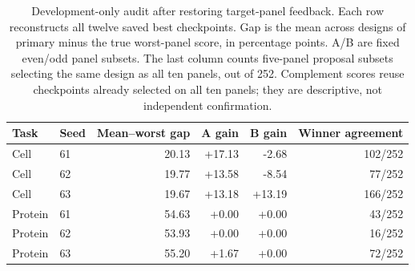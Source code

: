\begin{table}[htbp]
\centering
\small
\caption{Development-only audit after restoring target-panel feedback. Each row reconstructs all twelve saved best checkpoints. Gap is the mean across designs of primary minus the true worst-panel score, in percentage points. A/B are fixed even/odd panel subsets. The last column counts five-panel proposal subsets selecting the same design as all ten panels, out of 252. Complement scores reuse checkpoints already selected on all ten panels; they are descriptive, not independent confirmation.}
\label{tab:panel-feedback-audit}
\begin{tabular}{llrrrr}
\toprule
Task & Seed & Mean--worst gap & A gain & B gain & Winner agreement \\
\midrule
Cell & 61 & 20.13 & +17.13 & -2.68 & 102/252 \\
Cell & 62 & 19.77 & +13.58 & -8.54 & 77/252 \\
Cell & 63 & 19.67 & +13.18 & +13.19 & 166/252 \\
Protein & 61 & 54.63 & +0.00 & +0.00 & 43/252 \\
Protein & 62 & 53.93 & +0.00 & +0.00 & 16/252 \\
Protein & 63 & 55.20 & +1.67 & +0.00 & 72/252 \\
\bottomrule
\end{tabular}
\end{table}
